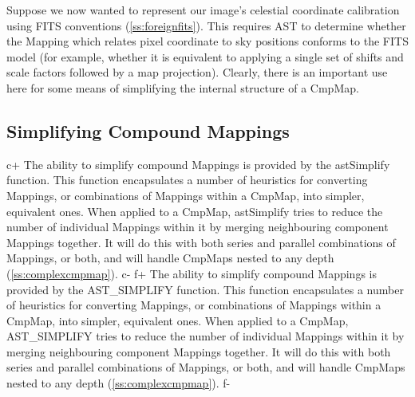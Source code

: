 \documentclass[twoside,11pt]{article}
\newcommand{\secref}[1]{\S\ref{#1}}
\renewcommand{\secref}[1]{\ref{#1}}
\begin{document}
Suppose we now wanted to represent our image's celestial coordinate
calibration using FITS conventions (\secref{ss:foreignfits}). This
requires AST to determine whether the Mapping which relates pixel
coordinate to sky positions conforms to the FITS model (for example,
whether it is equivalent to applying a single set of shifts and scale
factors followed by a map projection). Clearly, there is an important
use here for some means of simplifying the internal structure of a
CmpMap.

\subsection{\label{ss:simplifyingcmpmaps}Simplifying Compound Mappings}

c+
The ability to simplify compound Mappings is provided by the
astSimplify function. This function encapsulates a number of
heuristics for converting Mappings, or combinations of Mappings within
a CmpMap, into simpler, equivalent ones. When applied to a CmpMap,
astSimplify tries to reduce the number of individual Mappings within
it by merging neighbouring component Mappings together. It will do
this with both series and parallel combinations of Mappings, or both,
and will handle CmpMaps nested to any depth
(\secref{ss:complexcmpmap}).
c-
f+
The ability to simplify compound Mappings is provided by the
AST\_SIMPLIFY function. This function encapsulates a number of
heuristics for converting Mappings, or combinations of Mappings within
a CmpMap, into simpler, equivalent ones. When applied to a CmpMap,
AST\_SIMPLIFY tries to reduce the number of individual Mappings within
it by merging neighbouring component Mappings together. It will do
this with both series and parallel combinations of Mappings, or both,
and will handle CmpMaps nested to any depth
(\secref{ss:complexcmpmap}).
f-
\end{document}
